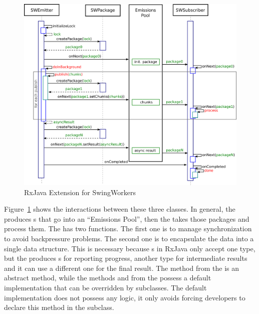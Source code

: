 \documentclass[type=bsc,accentcolor=tud9c]{tudthesis}
\newcommand{\framework}[1]{\textcolor{black!65}{#1}}
\begin{document}
\begin{figure}[h]
\begin{center}
\includegraphics[width=17cm]{design/rxjava-extension.png}
\end{center}
\caption{RxJava Extension for SwingWorkers}
\label{fig:rxjava-extension}
\end{figure}

Figure~\ref{fig:rxjava-extension} shows the interactions between these three classes. In general, the  produces s that go into an ``Emissions Pool'', then the  takes those packages and process them. The  has two functions. The first one is to manage synchronization to avoid backpressure problems. The second one is to encapsulate the data into a single data structure. This is necessary because s in \framework{RxJava} only accept one type, but the  produces s for reporting progress, another type for intermediate results and it can use a different one for the final result. The method  from the  is an abstract method, while the methods  and  from the  possess a default implementation that can be overridden by subclasses. The default implementation does not possess any logic, it only avoids forcing developers to declare this method in the subclass.
\end{document}
